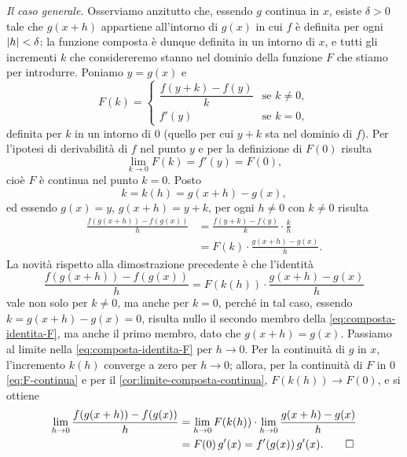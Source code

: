 \begin{dimostrazione}
\emph{Il caso generale.} Osserviamo anzitutto che, essendo $g$ continua in $x$, esiste
$\delta>0$ tale che $g(x+h)$ appartiene all'intorno di $g(x)$ in cui $f$ è definita per
ogni $\lvert h\rvert<\delta$: la funzione composta è dunque definita in un intorno di $x$, e
tutti gli incrementi $k$ che considereremo stanno nel dominio della funzione $F$ che
stiamo per introdurre. Poniamo $y=g(x)$ e
\begin{equation}\label{eq:funzione-F}
  F(k)=
  \begin{cases}
    \dfrac{f(y+k)-f(y)}{k} & \text{se } k\neq0,\\[1.5ex]
    f'(y) & \text{se } k=0,
  \end{cases}
\end{equation}
definita per $k$ in un intorno di $0$ (quello per cui $y+k$ sta nel dominio di $f$). Per
l'ipotesi di derivabilità di $f$ nel punto $y$ e per la definizione di $F(0)$ risulta
\begin{equation}\label{eq:F-continua}
  \lim_{k\to0}F(k)=f'(y)=F(0),
\end{equation}
cioè $F$ è continua nel punto $k=0$. Posto
\begin{equation}\label{eq:k-di-h}
  k=k(h)=g(x+h)-g(x),
\end{equation}
ed essendo $g(x)=y$, $g(x+h)=y+k$, per ogni $h\neq0$ con $k\neq0$ risulta
\begin{equation}\label{eq:composta-identita}
\begin{split}
  \frac{f(g(x+h))-f(g(x))}{h}&=\frac{f(y+k)-f(y)}{k}\cdot\frac kh\\
  &=F(k)\cdot\frac{g(x+h)-g(x)}{h}.
\end{split}
\end{equation}
La novità rispetto alla dimostrazione precedente è che l'identità
\begin{equation}\label{eq:composta-identita-F}
  \frac{f(g(x+h))-f(g(x))}{h}=F(k(h))\cdot\frac{g(x+h)-g(x)}{h}
\end{equation}
vale non solo per $k\neq0$, ma anche per $k=0$, perché in tal caso, essendo
$k=g(x+h)-g(x)=0$, risulta nullo il secondo membro della \eqref{eq:composta-identita-F},
ma anche il primo membro, dato che $g(x+h)=g(x)$. Passiamo al limite nella
\eqref{eq:composta-identita-F} per $h\to0$. Per la continuità di $g$ in $x$, l'incremento
$k(h)$ converge a zero per $h\to0$; allora, per la continuità di $F$ in $0$
\eqref{eq:F-continua} e per il \cref{cor:limite-composta-continua}, $F(k(h))\to F(0)$, e
si ottiene
\begin{equation}\label{eq:composta-conclusione}
\begin{split}
  \lim_{h\to0}\frac{f(g(x+h))-f(g(x))}{h}&=\lim_{h\to0}F(k(h))\cdot\lim_{h\to0}\frac{g(x+h)-g(x)}{h}\\
  &=F(0)\,g'(x)=f'(g(x))\,g'(x). \qedhere
\end{split}
\end{equation}
\end{dimostrazione}

